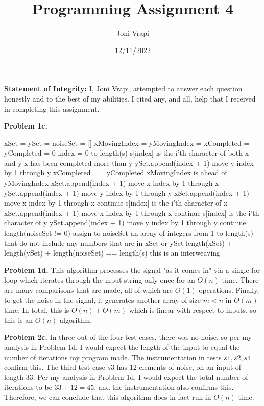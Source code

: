 \documentclass{article}
\title{Programming Assignment 4}
\author{Joni Vrapi}
\date{12/11/2022}
\begin{document}
\maketitle

\textbf{Statement of Integrity:} I, Joni Vrapi, attempted to answer each question honestly and to the best of my abilities. I cited any, and all, help that I received in completing this assignment.

\hfill

\textbf{Problem 1c.} 

\begin{codebox}
    \li xSet = ySet = noiseSet = []
    \li xMovingIndex = yMovingIndex = xCompleted = yCompleted = 0
    \li \For index = 0 to length(s) \Do
    \li \If s[index] is the i'th character of both x and y \Then
    \li \If x has been completed more than y \Then
    \li ySet.append(index + 1)
    \li move y index by 1 through y 
    \li \ElseIf xCompleted == yCompleted \Then
    \li \If xMovingIndex is ahead of yMovingIndex \Then
    \li xSet.append(index + 1)
    \li move x index by 1 through x
    \li \Else 
    \li ySet.append(index + 1)
    \li move y index by 1 through y \End
    \li \Else
    \li xSet.append(index + 1)
    \li move x index by 1 through x \End
    \li continue \End
    \li
    \li \If s[index] is the i'th character of x \Then
    \li xSet.append(index + 1)
    \li move x index by 1 through x 
    \li continue \End
    \li
    \li \If s[index] is the i'th character of y \Then
    \li ySet.append(index + 1)
    \li move y index by 1 through y
    \li continue \End
    \li
    \li \If length(noiseSet != 0) \Then
    \li assign to noiseSet an array of integers from 1 to length(s) 
    \li that do not include any numbers that are in xSet or ySet \End
    \li
    \li \If length(xSet) + length(ySet) + length(noiseSet) == length(s) \Then
    \li this is an interweaving \End
\end{codebox}

\hfill

\textbf{Problem 1d.} This algorithm processes the signal "as it comes in" via a single for loop which iterates through the input string only once for an $O(n)$ time. There are many comparisons that are made, all of which are $O(1)$ operations. Finally, to get the noise in the signal, it generates another array of size $m < n$ in $O(m)$ time. In total, this is $O(n) + O(m)$ which is linear with respect to inputs, so this is an $O(n)$ algorithm.

\hfill

\textbf{Problem 2c.} In three out of the four test cases, there was no noise, so per my analysis in Problem 1d, I would expect the length of the input to equal the number of iterations my program made. The instrumentation in tests ${s1, s2, s4}$ confirm this. The third test case $s3$ has 12 elements of noise, on an input of length 33. Per my analysis in Problem 1d, I would expect the total number of iterations to be $33 + 12 = 45$, and the instrumentation also confirms this. Therefore, we can conclude that this algorithm does in fact run in $O(n)$ time. 

\newpage
 

\end{document}

